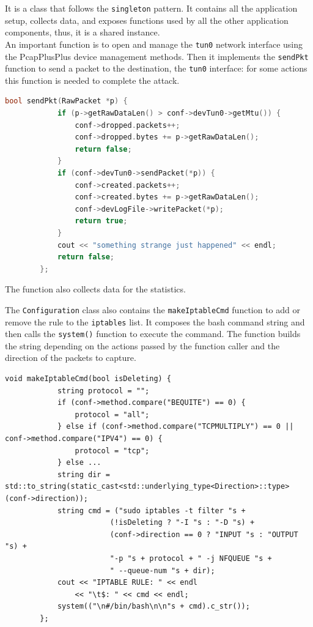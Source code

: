 \documentclass[12pt]{article}
\begin{document}
	It is a class that follows the \lstinline{singleton} pattern. It contains all the application setup, collects data, and exposes functions used by all the other application components, thus, it is a shared instance.\\
	\bigbreak
	An important function is to open and manage the \lstinline{tun0} network interface using the PcapPlusPlus device management methods. Then it implements the \lstinline{sendPkt} function to send a packet to the destination, the \lstinline{tun0} interface: for some actions this function is needed to complete the attack.\\
	
	\bigbreak

	\begin{lstlisting}[frame=single, language=C++]
		bool sendPkt(RawPacket *p) {
			if (p->getRawDataLen() > conf->devTun0->getMtu()) {
				conf->dropped.packets++;
				conf->dropped.bytes += p->getRawDataLen();
				return false;
			}
			if (conf->devTun0->sendPacket(*p)) {
				conf->created.packets++;
				conf->created.bytes += p->getRawDataLen();
				conf->devLogFile->writePacket(*p);
				return true;
			}
			cout << "something strange just happened" << endl;
			return false;
		};
	\end{lstlisting}
	\bigbreak
	The function also collects data for the statistics.
	\bigbreak

	The \lstinline{Configuration} class also contains the \lstinline{makeIptableCmd} function to add or remove the rule to the \lstinline{iptables} list. It composes the bash command string and then calls the \lstinline{system()} function to execute the command. The function builds the string depending on the actions passed by the function caller and the direction of the packets to capture.\\
	
	\bigbreak

	\begin{lstlisting}[frame=single]
		void makeIptableCmd(bool isDeleting) {
			string protocol = "";
			if (conf->method.compare("BEQUITE") == 0) {
				protocol = "all";
			} else if (conf->method.compare("TCPMULTIPLY") == 0 || conf->method.compare("IPV4") == 0) {
				protocol = "tcp";
			} else ...
			string dir = std::to_string(static_cast<std::underlying_type<Direction>::type>(conf->direction));
			string cmd = ("sudo iptables -t filter "s +
						(!isDeleting ? "-I "s : "-D "s) +
						(conf->direction == 0 ? "INPUT "s : "OUTPUT "s) +
						"-p "s + protocol + " -j NFQUEUE "s +
						" --queue-num "s + dir);
			cout << "IPTABLE RULE: " << endl
				<< "\t$: " << cmd << endl;
			system(("\n#/bin/bash\n\n"s + cmd).c_str());
		};
	\end{lstlisting}
	\bigbreak
\end{document}
